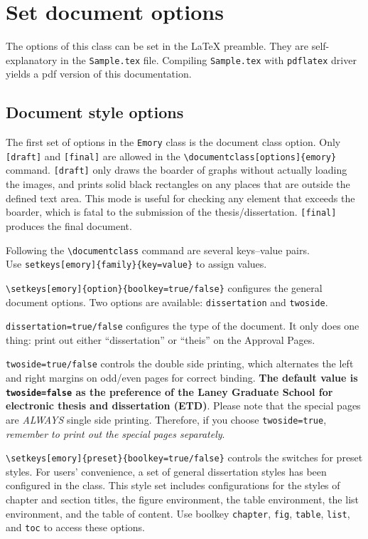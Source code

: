 \documentclass[final]{emory}
\begin{document}
\section{Set document options}\label{sec:options}
The options of this class can be set in the \LaTeX{} preamble. They are 
self-explanatory in the \Verb|Sample.tex| file.
Compiling \Verb|Sample.tex| with \Verb|pdflatex| driver yields a pdf version of this documentation.

\subsection{Document style options}
The first set of options in the \Verb|Emory| class is the document class option.
Only \Verb|[draft]| and \Verb|[final]| are allowed in the 
\Verb|\documentclass[options]{emory}| command.
\Verb|[draft]| only draws the boarder of graphs without actually loading the images,
and prints solid black rectangles on any places that are outside the defined text area. 
This mode is useful for checking any element that exceeds the boarder,
which is fatal to the submission of the thesis/dissertation.
\Verb|[final]| produces the final document. 

Following the \Verb|\documentclass| command are several keys--value pairs.\\
Use \Verb|setkeys[emory]{family}{key=value}| to assign values.

\Verb|\setkeys[emory]{option}{boolkey=true/false}| configures the general document options.
Two options are available: \Verb|dissertation| and \Verb|twoside|.

\Verb|dissertation=true/false| configures the type of the document. 
It only does one thing: print out either ``dissertation'' or ``theis'' on the 
Approval Pages.

\Verb|twoside=true/false| controls the double side printing, which alternates the left and right margins on odd/even pages for correct binding.
\textbf{The default value is \Verb|twoside=false| as the preference of the Laney Graduate School for electronic thesis and dissertation (ETD)}. 
Please note that the special pages are \emph{ALWAYS} single side printing. 
Therefore, if you choose \Verb|twoside=true|, \emph{remember to print out the special pages separately}.

\Verb|\setkeys[emory]{preset}{boolkey=true/false}| controls the switches for preset styles.
For users' convenience, a set of general dissertation styles has been configured in the class. 
This style set includes configurations for the styles of chapter and section 
titles, the figure environment, the table environment, the list environment, 
and the table of content. Use boolkey \Verb|chapter|, \Verb|fig|, \Verb|table|, 
\Verb|list|, and \Verb|toc| to access these options.
\end{document}
